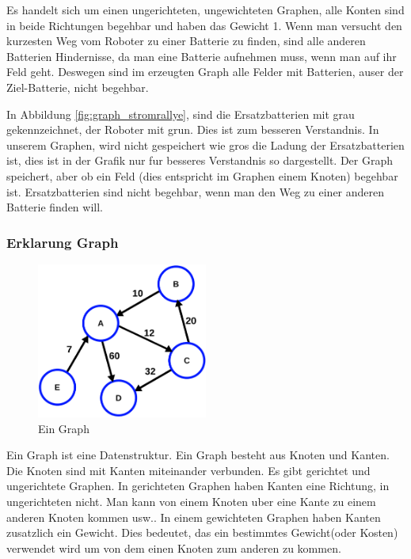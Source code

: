 \documentclass[a4paper,12pt,arial]{scrartcl}
\begin{document}
Es handelt sich um einen ungerichteten, ungewichteten Graphen, alle Konten sind in beide Richtungen begehbar und haben das Gewicht 1.
Wenn man versucht den kurzesten Weg vom Roboter zu einer Batterie zu finden, sind alle anderen Batterien Hindernisse, da man eine Batterie aufnehmen muss, wenn man auf ihr Feld geht. Deswegen sind im erzeugten Graph alle Felder mit Batterien, auser der Ziel-Batterie, nicht begehbar.

In Abbildung \ref{fig:graph_stromrallye}, sind die Ersatzbatterien mit grau gekennzeichnet, der Roboter mit grun.
Dies ist zum besseren Verstandnis.
In unserem Graphen, wird nicht gespeichert wie gros die Ladung der Ersatzbatterien ist, dies ist in der Grafik nur fur besseres Verstandnis so dargestellt.
Der Graph speichert, aber ob ein Feld (dies entspricht im Graphen einem Knoten) begehbar ist. Ersatzbatterien sind nicht begehbar, wenn man den Weg zu einer anderen Batterie finden will.

\newpage
\subsubsection{Erklarung Graph}
\begin{figure}
    \includegraphics[width=0.5\textwidth]{graph.pdf}
    \caption{Ein Graph \textcite{wikipediaGraph}}
    \label{fig:graph}
\end{figure}
Ein Graph ist eine Datenstruktur.
Ein Graph besteht aus Knoten und Kanten.
Die Knoten sind mit Kanten miteinander verbunden.
Es gibt gerichtet und ungerichtete Graphen.
In gerichteten Graphen haben Kanten eine Richtung, in ungerichteten nicht.
Man kann von einem Knoten uber eine Kante zu einem anderen Knoten kommen usw..
In einem gewichteten Graphen haben Kanten zusatzlich ein Gewicht. Dies bedeutet, das ein bestimmtes Gewicht(oder Kosten) verwendet wird um von dem einen Knoten zum anderen zu kommen.
\end{document}
